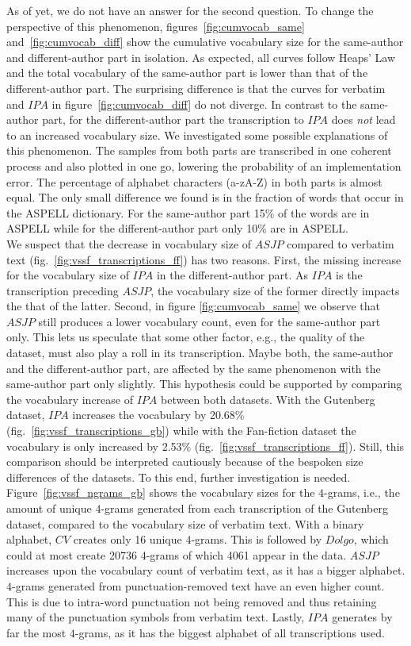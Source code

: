 As of yet, we do not have an answer for the second question.
To change the perspective of this phenomenon, figures~\ref{fig:cumvocab_same} and~\ref{fig:cumvocab_diff} show the cumulative vocabulary size for the same-author and different-author part in isolation.
As expected, all curves follow Heaps' Law and the total vocabulary of the same-author part is lower than that of the different-author part.
The surprising difference is that the curves for verbatim and $IPA$ in figure~\ref{fig:cumvocab_diff} do not diverge.
In contrast to the same-author part, for the different-author part the transcription to $IPA$ does \textit{not} lead to an increased vocabulary size.
We investigated some possible explanations of this phenomenon.
The samples from both parts are transcribed in one coherent process and also plotted in one go, lowering the probability of an implementation error.
The percentage of alphabet characters (a-zA-Z) in both parts is almost equal.
The only small difference we found is in the fraction of words that occur in the ASPELL dictionary.
For the same-author part 15\% of the words are in ASPELL while for the different-author part only 10\% are in ASPELL\@.\\
We suspect that the decrease in vocabulary size of $ASJP$ compared to verbatim text (fig.~\ref{fig:vssf_transcriptions_ff}) has two reasons.
First, the missing increase for the vocabulary size of $IPA$ in the different-author part.
As $IPA$ is the transcription preceding $ASJP$, the vocabulary size of the former directly impacts the that of the latter.
Second, in figure \ref{fig:cumvocab_same} we observe that $ASJP$ still produces a lower vocabulary count, even for the same-author part only.
This lets us speculate that some other factor, e.g., the quality of the dataset, must also play a roll in its transcription.
Maybe both, the same-author and the different-author part, are affected by the same phenomenon with the same-author part only slightly.
This hypothesis could be supported by comparing the vocabulary increase of $IPA$ between both datasets.
With the Gutenberg dataset, $IPA$ increases the vocabulary by 20.68\% (fig.~\ref{fig:vssf_transcriptions_gb}) while with the Fan-fiction dataset the vocabulary is only increased by 2.53\% (fig.~\ref{fig:vssf_transcriptions_ff}).
Still, this comparison should be interpreted cautiously because of the bespoken size differences of the datasets.
To this end, further investigation is needed.\\
Figure~\ref{fig:vssf_ngrams_gb} shows the vocabulary sizes for the $4$-grams, i.e., the amount of unique $4$-grams generated from each transcription of the Gutenberg dataset, compared to the vocabulary size of verbatim text.
With a binary alphabet, $CV$ creates only 16 unique $4$-grams.
This is followed by $Dolgo$, which could at most create 20736 $4$-grams of which 4061 appear in the data.
$ASJP$ increases upon the vocabulary count of verbatim text, as it has a bigger alphabet.
$4$-grams generated from punctuation-removed text have an even higher count.
This is due to intra-word punctuation not being removed and thus retaining many of the punctuation symbols from verbatim text.
Lastly, $IPA$ generates by far the most $4$-grams, as it has the biggest alphabet of all transcriptions used.


